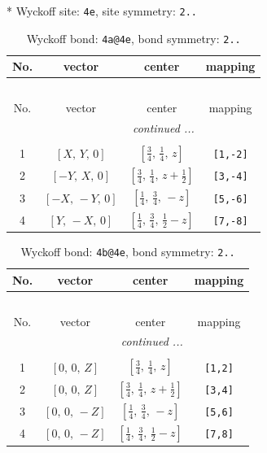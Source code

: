\documentclass[fleqn,8pt]{jsarticle}
\begin{document}
* Wyckoff site: {\tt 4e}, site symmetry: {\tt 2..}
\renewcommand{\arraystretch}{1.2}
\begin{longtable}{cccc}
\caption{Wyckoff bond: {\tt 4a@4e}, bond symmetry: {\tt 2..}}
 \\
 \hline \hline
No. & vector & center & mapping \\ \hline \endfirsthead

\multicolumn{3}{l}{\tablename\ \thetable{}} \\
 \hline \hline
No. & vector & center & mapping \\ \hline \endhead

 \hline \hline
\multicolumn{3}{r}{\footnotesize\it continued ...} \\ \endfoot

 \hline \hline
\multicolumn{3}{r}{} \\ \endlastfoot

1 & $\left[ X,\, Y,\, 0 \right]$ & $\left[ \frac{3}{4},\, \frac{1}{4},\, z \right]$ & {\tt [1,-2]} \\ \hline
2 & $\left[ - Y,\, X,\, 0 \right]$ & $\left[ \frac{3}{4},\, \frac{1}{4},\, z + \frac{1}{2} \right]$ & {\tt [3,-4]} \\ \hline
3 & $\left[ - X,\, - Y,\, 0 \right]$ & $\left[ \frac{1}{4},\, \frac{3}{4},\, - z \right]$ & {\tt [5,-6]} \\ \hline
4 & $\left[ Y,\, - X,\, 0 \right]$ & $\left[ \frac{1}{4},\, \frac{3}{4},\, \frac{1}{2} - z \right]$ & {\tt [7,-8]} \\
\end{longtable}
\renewcommand{\arraystretch}{1.2}
\begin{longtable}{cccc}
\caption{Wyckoff bond: {\tt 4b@4e}, bond symmetry: {\tt 2..}}
 \\
 \hline \hline
No. & vector & center & mapping \\ \hline \endfirsthead

\multicolumn{3}{l}{\tablename\ \thetable{}} \\
 \hline \hline
No. & vector & center & mapping \\ \hline \endhead

 \hline \hline
\multicolumn{3}{r}{\footnotesize\it continued ...} \\ \endfoot

 \hline \hline
\multicolumn{3}{r}{} \\ \endlastfoot

1 & $\left[ 0,\, 0,\, Z \right]$ & $\left[ \frac{3}{4},\, \frac{1}{4},\, z \right]$ & {\tt [1,2]} \\ \hline
2 & $\left[ 0,\, 0,\, Z \right]$ & $\left[ \frac{3}{4},\, \frac{1}{4},\, z + \frac{1}{2} \right]$ & {\tt [3,4]} \\ \hline
3 & $\left[ 0,\, 0,\, - Z \right]$ & $\left[ \frac{1}{4},\, \frac{3}{4},\, - z \right]$ & {\tt [5,6]} \\ \hline
4 & $\left[ 0,\, 0,\, - Z \right]$ & $\left[ \frac{1}{4},\, \frac{3}{4},\, \frac{1}{2} - z \right]$ & {\tt [7,8]} \\
\end{longtable}
\end{document}
